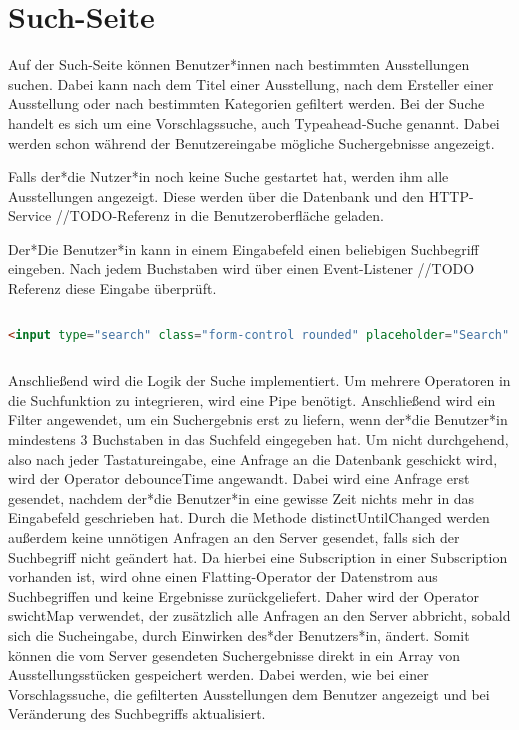 \section{Such-Seite}
Auf der Such-Seite können Benutzer*innen nach bestimmten Ausstellungen suchen. Dabei kann nach dem Titel einer Ausstellung, nach dem Ersteller einer Ausstellung oder nach bestimmten Kategorien gefiltert werden. Bei der Suche handelt es sich um eine Vorschlagssuche, auch Typeahead-Suche genannt. Dabei werden schon während der Benutzereingabe mögliche Suchergebnisse angezeigt.

Falls der*die Nutzer*in noch keine Suche gestartet hat, werden ihm alle Ausstellungen angezeigt. Diese werden über die Datenbank und den HTTP-Service //TODO-Referenz in die Benutzeroberfläche geladen. 

Der*Die Benutzer*in kann in einem Eingabefeld einen beliebigen Suchbegriff eingeben. Nach jedem Buchstaben wird über einen Event-Listener //TODO Referenz diese Eingabe überprüft. 

\begin{lstlisting}[caption={Eingabefeld},language=HTML]
    
<input type="search" class="form-control rounded" placeholder="Search" #input (keyup)="keyUp$.next(input.value)">
    
\end{lstlisting}

Anschließend wird die Logik der Suche implementiert. Um mehrere Operatoren in die Suchfunktion zu integrieren, wird eine Pipe benötigt. Anschließend wird ein Filter angewendet, um ein Suchergebnis erst zu liefern, wenn der*die Benutzer*in mindestens 3 Buchstaben in das Suchfeld eingegeben hat. Um nicht durchgehend, also nach jeder Tastatureingabe, eine Anfrage an die Datenbank geschickt wird, wird der Operator debounceTime angewandt. Dabei wird eine Anfrage erst gesendet, nachdem der*die Benutzer*in eine gewisse Zeit nichts mehr in das Eingabefeld geschrieben hat. Durch die Methode distinctUntilChanged werden außerdem keine unnötigen Anfragen an den Server gesendet, falls sich der Suchbegriff nicht geändert hat. Da hierbei eine Subscription in einer Subscription vorhanden ist, wird ohne einen Flatting-Operator der Datenstrom aus Suchbegriffen und keine Ergebnisse zurückgeliefert. Daher wird der Operator swichtMap verwendet, der zusätzlich alle Anfragen an den Server abbricht, sobald sich die Sucheingabe, durch Einwirken des*der Benutzers*in, ändert. Somit können die vom Server gesendeten Suchergebnisse direkt in ein Array von Ausstellungsstücken gespeichert werden. Dabei werden, wie bei einer Vorschlagssuche, die gefilterten Ausstellungen dem Benutzer angezeigt und bei Veränderung des Suchbegriffs aktualisiert.

